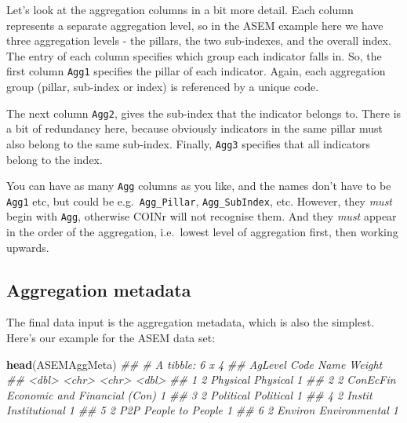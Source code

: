 \documentclass[
]{book}
\newenvironment{Shaded}{\begin{snugshade}}{\end{snugshade}}
\newcommand{\CommentTok}[1]{\textcolor[rgb]{0.56,0.35,0.01}{\textit{#1}}}
\newcommand{\KeywordTok}[1]{\textcolor[rgb]{0.13,0.29,0.53}{\textbf{#1}}}
\newcommand{\NormalTok}[1]{#1}
\begin{document}
Let's look at the aggregation columns in a bit more detail. Each column represents a separate aggregation level, so in the ASEM example here we have three aggregation levels - the pillars, the two sub-indexes, and the overall index. The entry of each column specifies which group each indicator falls in. So, the first column \texttt{Agg1} specifies the pillar of each indicator. Again, each aggregation group (pillar, sub-index or index) is referenced by a unique code.

The next column \texttt{Agg2}, gives the sub-index that the indicator belongs to. There is a bit of redundancy here, because obviously indicators in the same pillar must also belong to the same sub-index. Finally, \texttt{Agg3} specifies that all indicators belong to the index.

You can have as many \texttt{Agg} columns as you like, and the names don't have to be \texttt{Agg1} etc, but could be e.g.~\texttt{Agg\_Pillar}, \texttt{Agg\_SubIndex}, etc. However, they \emph{must} begin with \texttt{Agg}, otherwise COINr will not recognise them. And they \emph{must} appear in the order of the aggregation, i.e.~lowest level of aggregation first, then working upwards.

\hypertarget{aggregation-metadata}{%
\subsection{Aggregation metadata}\label{aggregation-metadata}}

The final data input is the aggregation metadata, which is also the simplest. Here's our example for the ASEM data set:

\begin{Shaded}
\begin{Highlighting}[]
\KeywordTok{head}\NormalTok{(ASEMAggMeta)}
\CommentTok{## # A tibble: 6 x 4}
\CommentTok{##   AgLevel Code      Name                         Weight}
\CommentTok{##     <dbl> <chr>     <chr>                         <dbl>}
\CommentTok{## 1       2 Physical  Physical                          1}
\CommentTok{## 2       2 ConEcFin  Economic and Financial (Con)      1}
\CommentTok{## 3       2 Political Political                         1}
\CommentTok{## 4       2 Instit    Institutional                     1}
\CommentTok{## 5       2 P2P       People to People                  1}
\CommentTok{## 6       2 Environ   Environmental                     1}
\end{Highlighting}
\end{Shaded}
\end{document}
